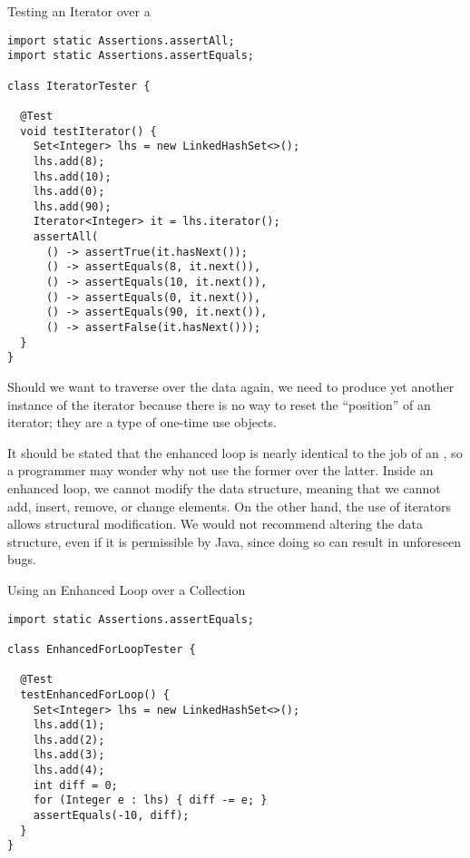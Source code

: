 \begin{cl}[]{Testing an Iterator over a }
\begin{lstlisting}[language=MyJava]
import static Assertions.assertAll;
import static Assertions.assertEquals;

class IteratorTester {

  @Test
  void testIterator() {
    Set<Integer> lhs = new LinkedHashSet<>();
    lhs.add(8);
    lhs.add(10);
    lhs.add(0);
    lhs.add(90);
    Iterator<Integer> it = lhs.iterator();
    assertAll(
      () -> assertTrue(it.hasNext());
      () -> assertEquals(8, it.next()),
      () -> assertEquals(10, it.next()),
      () -> assertEquals(0, it.next()),
      () -> assertEquals(90, it.next()),
      () -> assertFalse(it.hasNext()));
  }
} 
\end{lstlisting}
\end{cl}

Should we want to traverse over the data again, we need to produce yet another instance of the iterator because there is no way to reset the ``position'' of an iterator; they are a type of one-time use objects.

It should be stated that the enhanced  loop is nearly identical to the job of an , so a programmer may wonder why not use the former over the latter. Inside an enhanced  loop, we cannot modify the data structure, meaning that we cannot add, insert, remove, or change elements. On the other hand, the use of iterators allows structural modification. We would not recommend altering the data structure, even if it is permissible by Java, since doing so can result in unforeseen bugs. 


\begin{cl}[]{Using an Enhanced  Loop over a Collection}
\begin{lstlisting}[language=MyJava]
import static Assertions.assertEquals;

class EnhancedForLoopTester {

  @Test
  testEnhancedForLoop() {
    Set<Integer> lhs = new LinkedHashSet<>();
    lhs.add(1);
    lhs.add(2);
    lhs.add(3);
    lhs.add(4);
    int diff = 0;
    for (Integer e : lhs) { diff -= e; }
    assertEquals(-10, diff);
  }
}
\end{lstlisting}
\end{cl}

